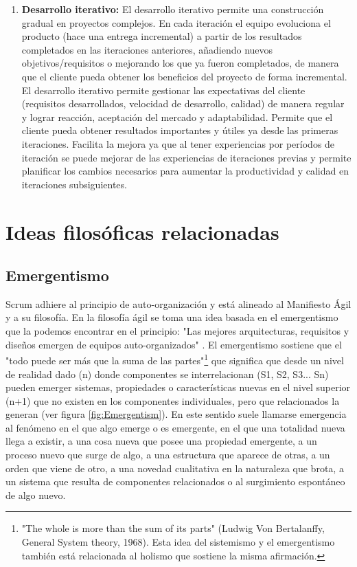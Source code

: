 \begin{enumerate}
\item \textbf{Desarrollo iterativo:} El desarrollo iterativo permite una construcción gradual en proyectos complejos. En cada iteración el equipo evoluciona el producto (hace una entrega incremental) a partir de los resultados completados en las iteraciones anteriores, añadiendo nuevos objetivos/requisitos o mejorando los que ya fueron completados, de manera que el cliente pueda obtener los beneficios del proyecto de forma incremental. El desarrollo iterativo permite gestionar las expectativas del cliente (requisitos desarrollados, velocidad de desarrollo, calidad) de manera regular y lograr reacción, aceptación del mercado y adaptabilidad. Permite que el cliente pueda obtener resultados importantes y útiles ya desde las primeras iteraciones. Facilita la mejora ya que al tener experiencias por períodos de iteración se puede mejorar de las experiencias de iteraciones previas y permite planificar los cambios necesarios para aumentar la productividad y calidad en iteraciones subsiguientes.

\end{enumerate}

\section{Ideas filosóficas relacionadas}

\subsection{Emergentismo}

Scrum adhiere al principio de auto-organización y está alineado al Manifiesto Ágil y a su filosofía. En la filosofía ágil se toma una idea basada en el emergentismo que la podemos encontrar en el principio: "Las mejores arquitecturas, requisitos y diseños emergen de equipos auto-organizados" \cite{Beck-2001}. El emergentismo sostiene que el "todo puede ser más que la suma de las partes"\footnote{"The whole is more than the sum of its parts" (Ludwig Von Bertalanffy, General System theory, 1968). Esta idea del sistemismo y el emergentismo también está relacionada al holismo que sostiene la misma afirmación.} que significa que desde un nivel de realidad dado (n) donde componentes se interrelacionan (S1, S2, S3... Sn) pueden emerger sistemas, propiedades o características nuevas en el nivel superior (n+1) que no existen en los componentes individuales, pero que relacionados la generan (ver figura \ref{fig:Emergentism}). En este sentido suele llamarse emergencia al fenómeno en el que algo emerge o es emergente, en el que una totalidad nueva llega a existir, a una cosa nueva que posee una propiedad emergente, a un proceso nuevo que surge de algo, a una estructura que aparece de otras, a un orden que viene de otro, a una novedad cualitativa en la naturaleza que brota, a un sistema que resulta de componentes relacionados o al surgimiento espontáneo de algo nuevo.

